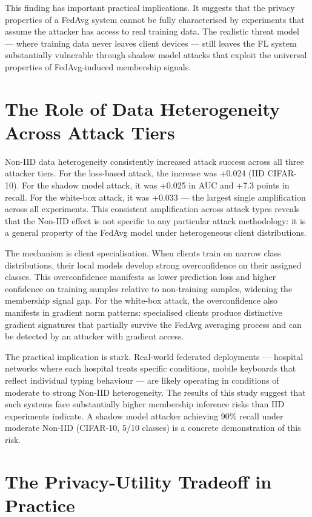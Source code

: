 \documentclass[12pt, a4paper]{report}
\begin{document}
This finding has important practical implications. It suggests that the privacy
properties of a FedAvg system cannot be fully characterised by experiments that
assume the attacker has access to real training data. The realistic threat model
--- where training data never leaves client devices --- still leaves the FL
system substantially vulnerable through shadow model attacks that exploit the
universal properties of FedAvg-induced membership signals.

\section{The Role of Data Heterogeneity Across Attack Tiers}

Non-IID data heterogeneity consistently increased attack success across all three
attacker tiers. For the loss-based attack, the increase was +0.024 (IID CIFAR-10).
For the shadow model attack, it was +0.025 in AUC and +7.3 points in recall. For
the white-box attack, it was +0.033 --- the largest single amplification across
all experiments. This consistent amplification across attack types reveals that
the Non-IID effect is not specific to any particular attack methodology: it is
a general property of the FedAvg model under heterogeneous client distributions.

The mechanism is client specialisation. When clients train on narrow class
distributions, their local models develop strong overconfidence on their assigned
classes. This overconfidence manifests as lower prediction loss and higher
confidence on training samples relative to non-training samples, widening the
membership signal gap. For the white-box attack, the overconfidence also manifests
in gradient norm patterns: specialised clients produce distinctive gradient
signatures that partially survive the FedAvg averaging process and can be detected
by an attacker with gradient access.

The practical implication is stark. Real-world federated deployments --- hospital
networks where each hospital treats specific conditions, mobile keyboards that
reflect individual typing behaviour --- are likely operating in conditions of
moderate to strong Non-IID heterogeneity. The results of this study suggest that
such systems face substantially higher membership inference risks than IID
experiments indicate. A shadow model attacker achieving 90\% recall under moderate
Non-IID (CIFAR-10, 5/10 classes) is a concrete demonstration of this risk.

\section{The Privacy-Utility Tradeoff in Practice}
\end{document}
